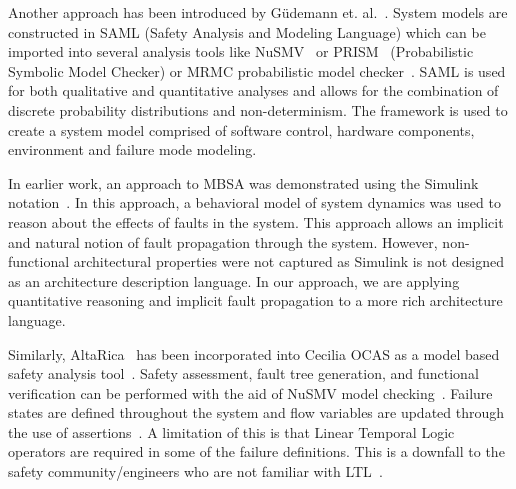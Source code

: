 Another approach has been introduced by G{\"u}demann et. al.~\cite{Gudemann:2010:FQQ:1909626.1909813}. System models are constructed in SAML (Safety Analysis and Modeling Language) which can be imported into several analysis tools like NuSMV~\cite{Cimatti2000} or PRISM~\cite{CAV2011:KwNoPa} (Probabilistic Symbolic Model Checker) or MRMC probabilistic model checker~\cite{Katoen:2005:MRM:1114692.1115230}. SAML is used for both qualitative and quantitative analyses and allows for the combination of discrete probability distributions and non-determinism. The framework is used to create a system model comprised of software control, hardware components, environment and failure mode modeling. 

In earlier work, an approach to MBSA was demonstrated using the Simulink\textsuperscript{\textregistered} notation~\cite{Joshi05:SafeComp,Joshi05:Dasc}. In this approach, a behavioral model of system dynamics was used to reason about the effects of faults in the system. This approach allows an implicit and natural notion of fault propagation through the system. However, non-functional architectural properties were not captured as Simulink is not designed as an architecture description language. In our approach, we are applying quantitative reasoning and implicit fault propagation to a more rich architecture language.

Similarly, AltaRica~\cite{PROSVIRNOVA2013127} has been incorporated into Cecilia OCAS as a model based safety analysis tool~\cite{BieberERTS2018}. Safety assessment, fault tree generation, and functional verification can be performed with the aid of NuSMV model checking~\cite{symbAltaRica}. Failure states are defined throughout the system and flow variables are updated through the use of assertions~\cite{Bieber04safetyassessment}. A limitation of this is that Linear Temporal Logic operators are required in some of the failure definitions. This is a downfall to the safety community/engineers who are not familiar with LTL~\cite{Bieber04safetyassessment}. 

